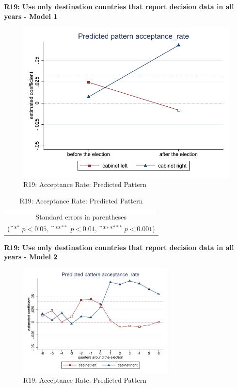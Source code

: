 \documentclass[10pt,a4paper]{scrartcl}
\begin{document}
\clearpage
\textbf{R19: Use only destination countries that report decision data in all years - Model 1}
\begin{figure}[!ht]
	\centering
	\includegraphics[width=1\textwidth]{figures_edited/acceptance_rate_graph1_R19.pdf}
	\caption{R19: Acceptance Rate: Predicted Pattern}
\end{figure}

\begin{table}[!ht]\centering
	\renewcommand{\arraystretch}{1.25}
	\def\sym#1{\ifmmode^{#1}\else\(^{#1}\)\fi}
	\caption{R19: Acceptance Rate: Predicted Pattern}
	\begin{tabular}{l*{2}{c}}
		\hline\hline
		
		\hline\hline
		\multicolumn{3}{c}{\footnotesize Standard errors in parentheses} \\
		\multicolumn{3}{c}{\footnotesize (\sym{*} \(p<0.05\), \sym{**} \(p<0.01\), \sym{***} \(p<0.001\))}\\
	\end{tabular}
\end{table}

\clearpage
\textbf{R19: Use only destination countries that report decision data in all years - Model 2}
\begin{figure}[!ht]
	\centering
	\includegraphics[width=0.7\textwidth]{figures_edited/acceptance_rate_graph2_R19.pdf}
	\caption{R19: Acceptance Rate: Predicted Pattern}
\end{figure}
\end{document}
